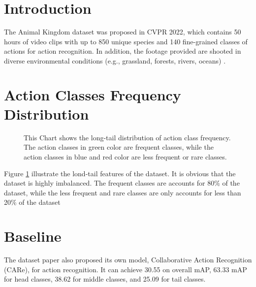 \section{Introduction}
The Animal Kingdom dataset was proposed in CVPR 2022, which contains 50 hours of video clips with up to 850 unique species and 140 fine-grained classes of actions for action recognition. In addition, the footage provided are shooted in diverse environmental conditions (e.g., grassland, forests, rivers, oceans) \parencite{ng2022animal}.

\section{Action Classes Frequency Distribution}

\begin{figure}[ht]
    \centering
    \resizebox{1.0\textwidth}{!}{}
    \caption[Action Classes Frequency Distribution]{This Chart shows the long-tail distribution of action class frequency. The action classes in green color are frequent classes, while the action classes in blue and red color are less frequent or rare classes.}
    \label{fig:classfreqdist}
\end{figure}

Figure \ref{fig:classfreqdist} illustrate the lond-tail features of the dataset. It is obvious that the dataset is highly imbalanced. The frequent classes are accounts for 80\% of the dataset, while the less frequent and rare classes are only accounts for less than 20\% of the dataset

\section{Baseline}
The dataset paper also proposed its own model, Collaborative Action Recognition (CARe), for action recognition. It can achieve 30.55 on overall mAP, 63.33 mAP for head classes, 38.62 for middle classes, and 25.09 for tail classes.
   